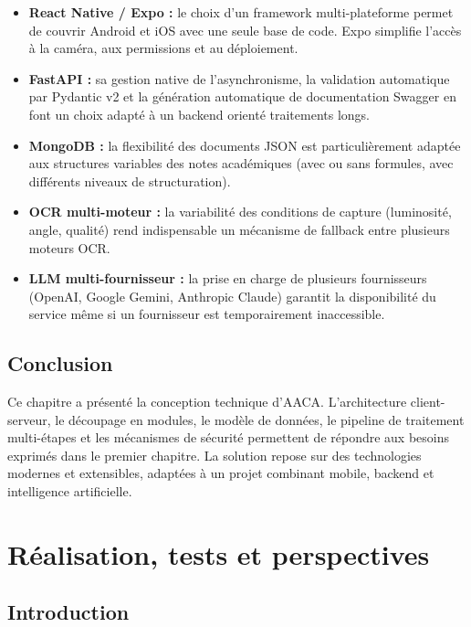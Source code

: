 \documentclass[12pt,a4paper]{report}
\begin{document}
\begin{itemize}[label=--]
    \item \textbf{React Native / Expo :} le choix d'un framework multi-plateforme permet de couvrir Android et iOS avec une seule base de code. Expo simplifie l'accès à la caméra, aux permissions et au déploiement.
    \item \textbf{FastAPI :} sa gestion native de l'asynchronisme, la validation automatique par Pydantic v2 et la génération automatique de documentation Swagger en font un choix adapté à un backend orienté traitements longs.
    \item \textbf{MongoDB :} la flexibilité des documents JSON est particulièrement adaptée aux structures variables des notes académiques (avec ou sans formules, avec différents niveaux de structuration).
    \item \textbf{OCR multi-moteur :} la variabilité des conditions de capture (luminosité, angle, qualité) rend indispensable un mécanisme de fallback entre plusieurs moteurs OCR.
    \item \textbf{LLM multi-fournisseur :} la prise en charge de plusieurs fournisseurs (OpenAI, Google Gemini, Anthropic Claude) garantit la disponibilité du service même si un fournisseur est temporairement inaccessible.
\end{itemize}

\section{Conclusion}

Ce chapitre a présenté la conception technique d'AACA. L'architecture client-serveur, le découpage en modules, le modèle de données, le pipeline de traitement multi-étapes et les mécanismes de sécurité permettent de répondre aux besoins exprimés dans le premier chapitre. La solution repose sur des technologies modernes et extensibles, adaptées à un projet combinant mobile, backend et intelligence artificielle.

\chapter{Réalisation, tests et perspectives}

\section{Introduction}
\end{document}
